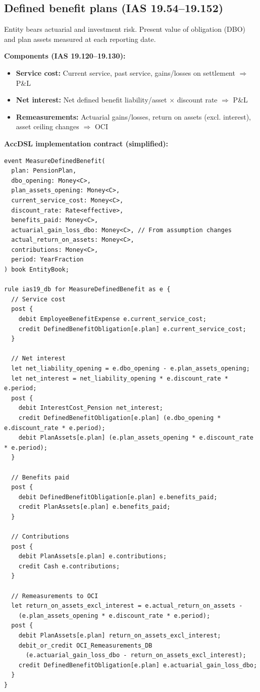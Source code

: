 
\subsection{Defined benefit plans (IAS 19.54--19.152)}

Entity bears actuarial and investment risk. Present value of obligation (DBO)
and plan assets measured at each reporting date.

\textbf{Components (IAS 19.120--19.130):}
\begin{itemize}
\item \textbf{Service cost:} Current service, past service, gains/losses on settlement
  $\Rightarrow$ P\&L
\item \textbf{Net interest:} Net defined benefit liability/asset $\times$ discount rate
  $\Rightarrow$ P\&L
\item \textbf{Remeasurements:} Actuarial gains/losses, return on assets (excl. interest),
  asset ceiling changes $\Rightarrow$ OCI
\end{itemize}

\textbf{AccDSL implementation contract (simplified):}

\begin{lstlisting}
event MeasureDefinedBenefit(
  plan: PensionPlan,
  dbo_opening: Money<C>,
  plan_assets_opening: Money<C>,
  current_service_cost: Money<C>,
  discount_rate: Rate<effective>,
  benefits_paid: Money<C>,
  actuarial_gain_loss_dbo: Money<C>, // From assumption changes
  actual_return_on_assets: Money<C>,
  contributions: Money<C>,
  period: YearFraction
) book EntityBook;

rule ias19_db for MeasureDefinedBenefit as e {
  // Service cost
  post {
    debit EmployeeBenefitExpense e.current_service_cost;
    credit DefinedBenefitObligation[e.plan] e.current_service_cost;
  }

  // Net interest
  let net_liability_opening = e.dbo_opening - e.plan_assets_opening;
  let net_interest = net_liability_opening * e.discount_rate * e.period;
  post {
    debit InterestCost_Pension net_interest;
    credit DefinedBenefitObligation[e.plan] (e.dbo_opening * e.discount_rate * e.period);
    debit PlanAssets[e.plan] (e.plan_assets_opening * e.discount_rate * e.period);
  }

  // Benefits paid
  post {
    debit DefinedBenefitObligation[e.plan] e.benefits_paid;
    credit PlanAssets[e.plan] e.benefits_paid;
  }

  // Contributions
  post {
    debit PlanAssets[e.plan] e.contributions;
    credit Cash e.contributions;
  }

  // Remeasurements to OCI
  let return_on_assets_excl_interest = e.actual_return_on_assets -
    (e.plan_assets_opening * e.discount_rate * e.period);
  post {
    debit PlanAssets[e.plan] return_on_assets_excl_interest;
    debit_or_credit OCI_Remeasurements_DB
      (e.actuarial_gain_loss_dbo - return_on_assets_excl_interest);
    credit DefinedBenefitObligation[e.plan] e.actuarial_gain_loss_dbo;
  }
}
\end{lstlisting}

